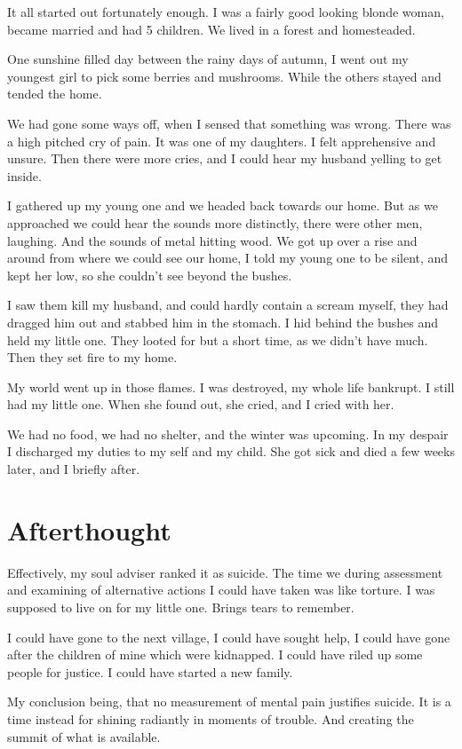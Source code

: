 It all started out fortunately enough. I was a fairly good looking blonde woman,
became married and had 5 children. We lived in a forest and homesteaded. 

One sunshine filled day between the rainy days of autumn, I went out  my
youngest girl to pick some berries and mushrooms. While the others stayed and
tended the home. 

We had gone some ways off, when I sensed that something was wrong. There was a
high pitched cry of pain. It was one of my daughters. I felt apprehensive and
unsure. Then there were more cries, and I could hear my husband yelling to get
inside. 

I gathered up my young one and we headed back towards our home. But as we
approached we could hear the sounds more distinctly, there were other men,
laughing. And the sounds of metal hitting wood.
We got up over a rise and around from where we could see our home, 
I told my young one to be silent, and kept her low, so she couldn't see 
beyond the bushes. 

I saw them kill my husband, and could hardly contain a scream myself, they had
dragged him out and stabbed him in the stomach. I hid behind the bushes and held
my little one.  They looted for but a short time, as we didn't have much. Then
they set fire to my home. 

My world went up in those flames. I was destroyed, my whole life bankrupt. I
still had my little one. When she found out, she cried, and I cried with her.

We had no food, we had no shelter, and the winter was upcoming. In my despair I
discharged my duties to my self and my child. She got sick and died a few weeks
later, and I briefly after. 

\section{Afterthought}

Effectively, my soul adviser ranked it as suicide. The time we during assessment
and examining of alternative actions I could have taken was like torture. 
I was supposed to live on for my little one. Brings tears to remember.

I could have gone to the next village, I could have sought help, I could have
gone after the children of mine which were kidnapped. I could have riled up some
people for justice. I could have started a new family.

My conclusion being, that no measurement of mental pain justifies suicide. It
is a time instead for shining radiantly in moments of trouble. And creating the
summit of what is available. 

